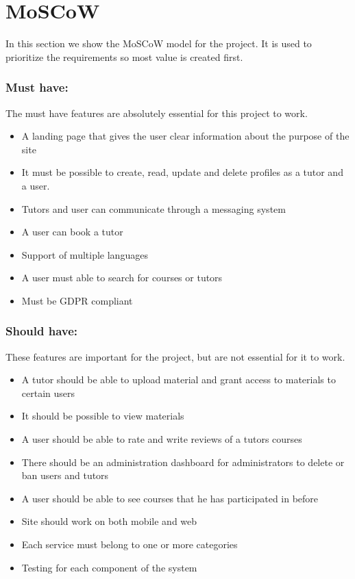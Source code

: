 \section{MoSCoW}
In this section we show the MoSCoW model for the project.
It is used to prioritize the requirements so most value is created first.

\subsubsection{Must have:}
The must have features are absolutely essential for this project to work. 

\begin{itemize}
    \item A landing page that gives the user clear information about the purpose of the site
    \item It must be possible to create, read, update and delete profiles as a tutor and a user.
    \item Tutors and user can communicate through a messaging system
    \item A user can book a tutor
    \item Support of multiple languages
    \item A user must able to search for courses or tutors
    \item Must be GDPR compliant
\end{itemize}

\subsubsection{Should have:}
These features are important for the project, but are not essential for it to work.

\begin{itemize}
    \item A tutor should be able to upload material and grant access to materials to certain users
    \item It should be possible to view materials
    \item A user should be able to rate and write reviews of a tutors courses
    \item There should be an administration dashboard for administrators to delete or ban users and tutors
    \item A user should be able to see courses that he has participated in before
    \item Site should work on both mobile and web
    \item Each service must belong to one or more categories
    \item Testing for each component of the system
\end{itemize}

